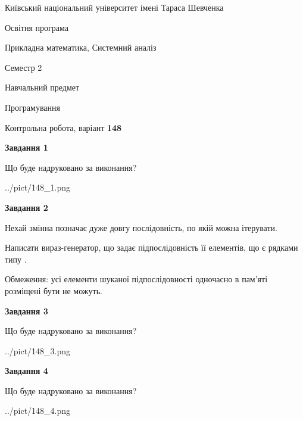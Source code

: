 \documentclass[12pt, ukrainian]{article}
\begin{document}
{{\begin {small}\par
{ \center  Київський національний університет імені Тараса Шевченка \par}
{\parbox {5 cm}{Освітня програма \hfill}{\parbox {8 cm}{Прикладна математика, Системний аналіз \hfill}}\parbox {5 cm}{\hfill Семестр 2}}\par
{\parbox {5 cm} {Навчальний предмет \hfill}\parbox {7 cm}{Програмування \hfill}\parbox {6cm}{\hfill}\par}\vspace{-7pt} \end{small}}{\center Контрольна робота, варіант  \No \textbf
{ 148 }\par}}
{
\begin {large}
{\begin {center}\textbf{Завдання 1}\end {center}}\par
Що буде надруковано за виконання?\par\par
\begin{center}
	{../pict/148_1.png}
\end{center}
\newpage

{\begin {center}\textbf{Завдання 2}\end {center}}\par
Нехай змінна  позначає дуже довгу послідовність, по якій можна ітерувати.

Написати вираз-генератор, що задає підпослідовність її елементів, що є рядками типу .

Обмеження: усі елементи шуканої підпослідовності одночасно в пам'яті розміщені бути не можуть.\par
\newpage

{\begin {center}\textbf{Завдання 3}\end {center}}\par
Що буде надруковано за виконання?\par
\begin{center}
	{../pict/148_3.png}
\end{center}
\newpage

{\begin {center}\textbf{Завдання 4}\end {center}}\par
Що буде надруковано за виконання?\par
\begin{center}
	{../pict/148_4.png}
\end{center}
\newpage


\end{large}}
\end{document}
